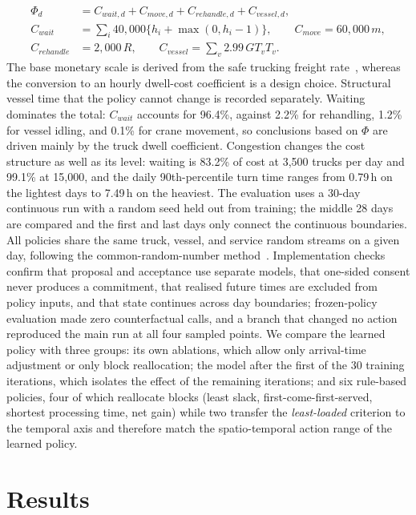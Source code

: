 \documentclass[a4paper]{llncs}
\begin{document}
\begin{equation}
\begin{aligned}
\Phi_d&=C_{wait,d}+C_{move,d}+C_{rehandle,d}+C_{vessel,d},\\
C_{wait}&=\sum_i 40{,}000\{h_i+\max(0,h_i-1)\},\qquad
C_{move}=60{,}000\,m,\\
C_{rehandle}&=2{,}000\,R,\qquad
C_{vessel}=\sum_v 2.99\,GT_v T_v.
\end{aligned}
\end{equation}
The base monetary scale is
derived from the safe trucking freight rate~\cite{ref24}, whereas the
conversion to an hourly dwell-cost coefficient is a design choice.
Structural vessel time that the policy cannot change is recorded
separately. Waiting dominates the total: $C_{wait}$ accounts for 96.4\%,
against 2.2\% for rehandling, 1.2\% for vessel idling, and 0.1\% for
crane movement, so conclusions based on $\Phi$ are driven mainly by the
truck dwell coefficient. Congestion changes the cost structure as well
as its level: waiting is 83.2\% of cost at 3{,}500 trucks per day and
99.1\% at 15{,}000, and the daily 90th-percentile turn time ranges from
0.79\,h on the lightest days to 7.49\,h on the heaviest.
The evaluation uses a 30-day continuous run with a random seed held
out from training; the middle 28 days are
compared and the first and last days only connect the continuous
boundaries. All policies share the same truck, vessel, and service
random streams on a given day, following the common-random-number
method~\cite{ref22}. Implementation checks confirm that proposal and acceptance use separate
models, that one-sided consent never produces a commitment, that realised
future times
are excluded from policy inputs, and that state continues across day
boundaries; frozen-policy evaluation made zero counterfactual calls, and
a branch that changed no action reproduced the main run at all four
sampled points. We compare the learned policy with three groups:
its own ablations, which allow only arrival-time adjustment or only
block reallocation; the model after the first of the 30 training
iterations, which isolates the effect of the remaining iterations; and
six rule-based policies, four of which reallocate blocks
(least slack, first-come-first-served, shortest processing time, net
gain) while two transfer the \emph{least-loaded} criterion to the
temporal axis and therefore match the spatio-temporal action range of
the learned policy.

\section{Results}
\label{sec:exp}
\end{document}
